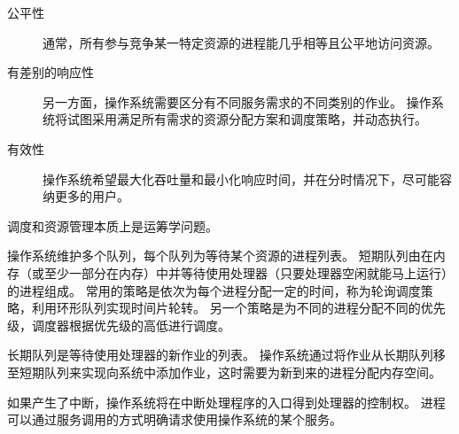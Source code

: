 {{        \begin{description}
            \item[公平性] 通常，所有参与竞争某一特定资源的进程能几乎相等且公平地访问资源。
            \item[有差别的响应性]
            {
                另一方面，操作系统需要区分有不同服务需求的不同类别的作业。
                操作系统将试图采用满足所有需求的资源分配方案和调度策略，并动态执行。
            }
            \item[有效性] 操作系统希望最大化吞吐量和最小化响应时间，并在分时情况下，尽可能容纳更多的用户。
        \end{description}

        调度和资源管理本质上是运筹学问题。

        操作系统维护多个队列，每个队列为等待某个资源的进程列表。
        短期队列由在内存（或至少一部分在内存）中并等待使用处理器（只要处理器空闲就能马上运行）的进程组成。
        常用的策略是依次为每个进程分配一定的时间，称为轮询调度策略，利用环形队列实现时间片轮转。
        另一个策略是为不同的进程分配不同的优先级，调度器根据优先级的高低进行调度。

        长期队列是等待使用处理器的新作业的列表。
        操作系统通过将作业从长期队列移至短期队列来实现向系统中添加作业，这时需要为新到来的进程分配内存空间。

        如果产生了中断，操作系统将在中断处理程序的入口得到处理器的控制权。
        进程可以通过服务调用的方式明确请求使用操作系统的某个服务。
    }
}
